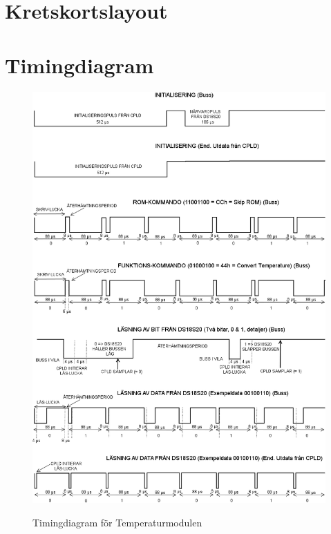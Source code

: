 \documentclass[a4paper,11pt]{article}
\begin{document}
	\section{Kretskortslayout}
	
	\section{Timingdiagram}

		\begin{figure}[ht!tb]
		  \centering
		      \includegraphics[scale=0.5, angle=0]{TempTiming.png}
			\label{fig:TempTiming}
		  	\caption{Timingdiagram för Temperaturmodulen}
		\end{figure}
\end{document}

